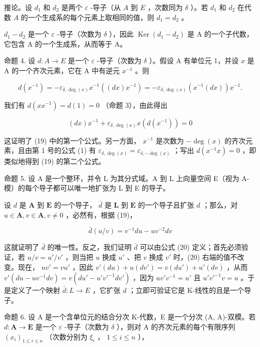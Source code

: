 推论。设 \(d_1\) 和 \(d_2\) 是两个 \(\varepsilon\) -导子（从 \(A\) 到 \(E\) ，次数同为 \(\delta\) ）。若 \(d_1\) 和 \(d_2\) 在代数 \(A\) 的一个生成系的每个元素上取相同的值，则 \(d_1 = d_2\) 。

\(d_{1} - d_{2}\) 是一个 \(\varepsilon\) -导子（次数为 \(\delta\) ），因此 \(\operatorname{Ker}(d_1 - d_2)\) 是 A 的一个子代数，它包含 A 的一个生成系，从而等于 A。

命题 4. 设 \(d:A\to E\) 是一个 \(\varepsilon\) -导子（次数为 \(\delta\) ）。假设 A 有单位元 1，并设 \(x\) 是 A 的一个齐次元素，它在 A 中有逆元 \(x^{-1}\) 。则

\[
d (x ^ {- 1}) = - \varepsilon_ {\delta , \deg (x)} x ^ {- 1} ((d x) x ^ {- 1}) = - \varepsilon_ {\delta , \deg (x)} (x ^ {- 1} (d x)) x ^ {- 1}.\tag{19}
\]

我们有 \(d(xx^{-1}) = d(1) = 0\) （命题 3），由此得出

\[
(d x) x ^ {- 1} + \varepsilon_ {\delta , \deg (x)} x (d (x ^ {- 1})) = 0
\]

这证明了 (19) 中的第一个公式。另一方面， \(x^{-1}\) 是次数为 \(-\deg(x)\) 的齐次元素，且由第 1 号的公式 (1) 有 \(\varepsilon_{\delta,\deg(x)} = \varepsilon_{\delta,-\deg(x)}\) ；写出 \(d(x^{-1}x) = 0\) ，即类似地得到 (19) 的第二个公式。

命题 5. 设 A 是一个整环，并令 L 为其分式域。A 到 L 上向量空间 E（视为 A-模）的每个导子都可以唯一地扩张为 L 到 E 的导子。

设 \(d\) 是 \(\mathbf{A}\) 到 \(\mathbf{E}\) 的一个导子， \(\bar{d}\) 是 \(\mathbf{L}\) 到 \(\mathbf{E}\) 的一个导子且扩张 \(d\) ；那么，对 \(u \in \mathbf{A}, v \in \mathbf{A}, v \neq 0\) ，必然有，根据 (19)，

\[
\bar {d} (u / v) = v ^ {- 1} d u - u v ^ {- 2} d v\tag{20}
\]

这就证明了 \(\bar{d}\) 的唯一性。反之，我们证明 \(\bar{d}\) 可以由公式 (20) 定义；首先必须验证，若 \(u / v = u' / v'\) ，则当把 \(u\) 换成 \(u'\) 、把 \(v\) 换成 \(v'\) 时，(20) 右端的值不改变。现在， \(uv' = vu'\) ，因此 \(v'(du) + u(dv') = v(du') + u'(dv)\) ，从而 \(v'(du - uv^{-1}dv) = v(du' - u'v'^{-1}dv')\) ，因为 \(uv'v^{-1} = u'\) 且 \(u'v'^{-1}v = u\) 。于是定义了一个映射 \(\bar{d}: L \to E\) ，它扩张 \(d\) ；立即可验证它是 K-线性的且是一个导子。

命题 6. 设 A 是一个含单位元的结合分次 K-代数，E 是一个分次 (A, A)-双模。若 \(d: \mathbf{A} \to \mathbf{E}\) 是一个 \(\varepsilon\) -导子（次数为 \(\delta\) ），则对 A 的齐次元素的每个有限序列 \((x_i)_{1 \leqslant i \leqslant n}\) （次数分别为 \(\xi_i\) ， \(1 \leqslant i \leqslant n\) ），

